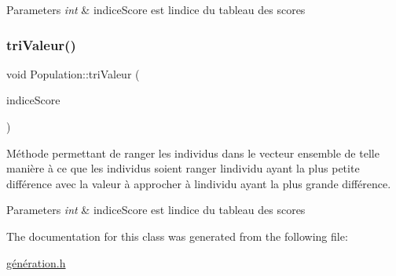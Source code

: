 \begin{DoxyParams}{Parameters}
{\em int} & indice\+Score est l\textquotesingle{}indice du tableau des scores \\
\hline
\end{DoxyParams}
\mbox{\label{class_population_a4b167d07f145a1f1ea69b2bb4cfd2cfb}} 
\subsubsection{\texorpdfstring{tri\+Valeur()}{triValeur()}}
{\footnotesize\ttfamily void Population\+::tri\+Valeur (\begin{DoxyParamCaption}\item[{int}]{indice\+Score }\end{DoxyParamCaption})}



Méthode permettant de ranger les individus dans le vecteur ensemble de telle manière à ce que les individus soient ranger l\textquotesingle{}individu ayant la plus petite différence avec la valeur à approcher à l\textquotesingle{}individu ayant la plus grande différence. 


\begin{DoxyParams}{Parameters}
{\em int} & indice\+Score est l\textquotesingle{}indice du tableau des scores \\
\hline
\end{DoxyParams}


The documentation for this class was generated from the following file\+:\begin{DoxyCompactItemize}
\item 
\hyperlink{g_xC3_xA9n_xC3_xA9ration_8h}{génération.\+h}\end{DoxyCompactItemize}
